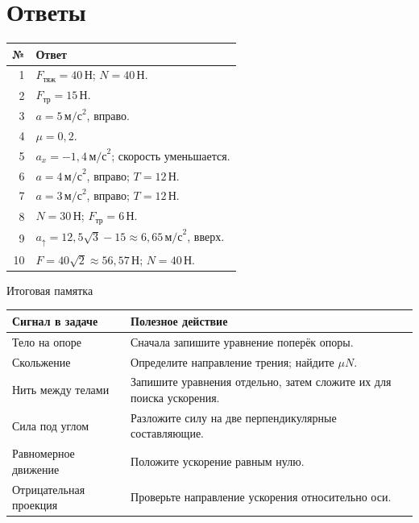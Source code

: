 \documentclass[a4paper,12pt]{article}
\newcommand{\unit}[1]{\,\text{#1}}
\begin{document}
\section*{Ответы}
\begin{center}
\renewcommand{\arraystretch}{1.55}
\begin{tabularx}{\linewidth}{@{}r X@{}}\toprule
№ & Ответ\\\midrule
1 & $F_{\text{тяж}}=40\unit{Н}$; $N=40\unit{Н}$.\\
2 & $F_{\text{тр}}=15\unit{Н}$.\\
3 & $a=5\unit{м/с}^2$, вправо.\\
4 & $\mu=0,2$.\\
5 & $a_x=-1,4\unit{м/с}^2$; скорость уменьшается.\\
6 & $a=4\unit{м/с}^2$, вправо; $T=12\unit{Н}$.\\
7 & $a=3\unit{м/с}^2$, вправо; $T=12\unit{Н}$.\\
8 & $N=30\unit{Н}$; $F_{\text{тр}}=6\unit{Н}$.\\
9 & $a_{\uparrow}=12,5\sqrt3-15\approx6,65\unit{м/с}^2$, вверх.\\
10 & $F=40\sqrt2\approx56,57\unit{Н}$; $N=40\unit{Н}$.\\\bottomrule
\end{tabularx}
\end{center}
\vspace{10mm}
\begin{center}{\large\color{darkaccent} Итоговая памятка}\end{center}
\renewcommand{\arraystretch}{1.3}
\begin{tabularx}{\linewidth}{@{}>{\raggedright\arraybackslash}p{4.8cm} X@{}}\toprule
Сигнал в задаче & Полезное действие\\\midrule
Тело на опоре & Сначала запишите уравнение поперёк опоры.\\
Скольжение & Определите направление трения; найдите $\mu N$.\\
Нить между телами & Запишите уравнения отдельно, затем сложите их для поиска ускорения.\\
Сила под углом & Разложите силу на две перпендикулярные составляющие.\\
Равномерное движение & Положите ускорение равным нулю.\\
Отрицательная проекция & Проверьте направление ускорения относительно оси.\\\bottomrule
\end{tabularx}
\end{document}

